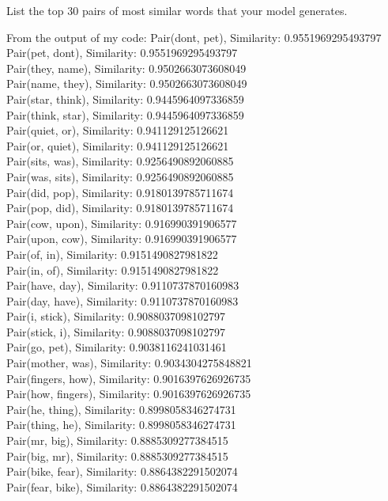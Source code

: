 \problem[1]
List the top 30 pairs of most similar words that your model generates.
\begin{solution}
	From the output of my code:
	Pair(dont, pet), Similarity: 0.9551969295493797\\
Pair(pet, dont), Similarity: 0.9551969295493797\\
Pair(they, name), Similarity: 0.9502663073608049\\
Pair(name, they), Similarity: 0.9502663073608049\\
Pair(star, think), Similarity: 0.9445964097336859\\
Pair(think, star), Similarity: 0.9445964097336859\\
Pair(quiet, or), Similarity: 0.941129125126621\\
Pair(or, quiet), Similarity: 0.941129125126621\\
Pair(sits, was), Similarity: 0.9256490892060885\\
Pair(was, sits), Similarity: 0.9256490892060885\\
Pair(did, pop), Similarity: 0.9180139785711674\\
Pair(pop, did), Similarity: 0.9180139785711674\\
Pair(cow, upon), Similarity: 0.916990391906577\\
Pair(upon, cow), Similarity: 0.916990391906577\\
Pair(of, in), Similarity: 0.9151490827981822\\
Pair(in, of), Similarity: 0.9151490827981822\\
Pair(have, day), Similarity: 0.9110737870160983\\
Pair(day, have), Similarity: 0.9110737870160983\\
Pair(i, stick), Similarity: 0.9088037098102797\\
Pair(stick, i), Similarity: 0.9088037098102797\\
Pair(go, pet), Similarity: 0.9038116241031461\\
Pair(mother, was), Similarity: 0.9034304275848821\\
Pair(fingers, how), Similarity: 0.9016397626926735\\
Pair(how, fingers), Similarity: 0.9016397626926735\\
Pair(he, thing), Similarity: 0.8998058346274731\\
Pair(thing, he), Similarity: 0.8998058346274731\\
Pair(mr, big), Similarity: 0.8885309277384515\\
Pair(big, mr), Similarity: 0.8885309277384515\\
Pair(bike, fear), Similarity: 0.8864382291502074\\
Pair(fear, bike), Similarity: 0.8864382291502074\\
\end{solution}

